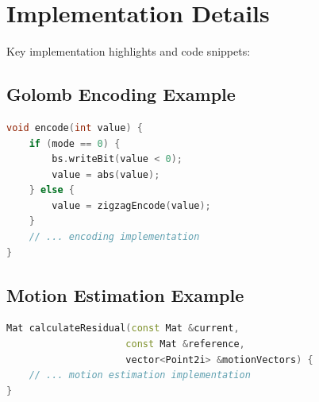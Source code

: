 \documentclass[a4paper,14pt]{article}
\begin{document}
\appendix
\section{Implementation Details}
Key implementation highlights and code snippets:

\subsection{Golomb Encoding Example}
\begin{lstlisting}[language=C++]
void encode(int value) {
    if (mode == 0) {
        bs.writeBit(value < 0);
        value = abs(value);
    } else {
        value = zigzagEncode(value);
    }
    // ... encoding implementation
}
\end{lstlisting}

\subsection{Motion Estimation Example}
\begin{lstlisting}[language=C++]
Mat calculateResidual(const Mat &current, 
                     const Mat &reference, 
                     vector<Point2i> &motionVectors) {
    // ... motion estimation implementation
}
\end{lstlisting}
\end{document}
